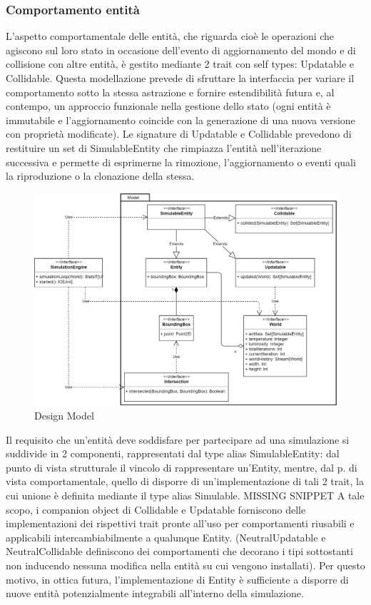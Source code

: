 \subsubsection{Comportamento entità}
L’aspetto comportamentale delle entità, che riguarda cioè le operazioni che agiscono sul loro stato in occasione dell’evento di aggiornamento del mondo e di collisione con altre entità, è gestito mediante 2 trait con self types: Updatable e Collidable. Questa modellazione prevede di sfruttare la interfaccia per variare il comportamento sotto la stessa astrazione e fornire estendibilità futura e, al contempo, un approccio funzionale nella gestione dello stato (ogni entità è immutabile e l’aggiornamento coincide con la generazione di una nuova versione con proprietà modificate). Le signature di Updatable e Collidable prevedono di restituire un set di SimulableEntity che rimpiazza l’entità nell’iterazione successiva e permette di esprimerne la rimozione, l’aggiornamento o eventi quali la riproduzione o la clonazione della stessa.
\begin{figure}[h!]
\centering
\includegraphics[width=\textwidth, scale=0.44]{img/Model.png}
\caption{Design Model}
\label{fig:model}
\end{figure}
Il requisito che un’entità deve soddisfare per partecipare ad una simulazione si suddivide in 2 componenti, rappresentati dal type alias SimulableEntity: dal punto di vista strutturale il vincolo di rappresentare un’Entity, mentre, dal p. di vista comportamentale, quello di disporre di un’implementazione di tali 2 trait, la cui unione è definita mediante il type alias Simulable. 
MISSING SNIPPET
A tale scopo, i companion object di Collidable e Updatable forniscono delle implementazioni dei rispettivi trait pronte all’uso per comportamenti riusabili e applicabili intercambiabilmente a qualunque Entity. (NeutralUpdatable e NeutralCollidable definiscono dei comportamenti che decorano i tipi sottostanti non inducendo nessuna modifica nella entità su cui vengono installati). Per questo motivo, in ottica futura, l’implementazione di Entity è sufficiente a disporre di nuove entità potenzialmente integrabili all’interno della simulazione.


